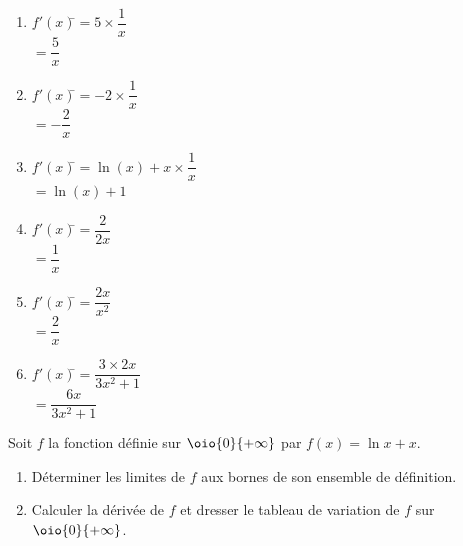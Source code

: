 \documentclass[a4paper,11pt,exos]{nsi} %
\begin{document}
\textcolor{UGLiBlue}{
    \begin{multicols}{3}
        \begin{enumerate}
            \item \begin{tabbing}
                $f'(x)$\=$=5\times \dfrac{1}{x}$\\[.5em]
                \>$=\dfrac{5}{x}$
            \end{tabbing}
            \item \begin{tabbing}
                $f'(x)$\=$=-2\times \dfrac{1}{x}$\\[.5em]
                \>$=-\dfrac{2}{x}$
            \end{tabbing}
            \item \begin{tabbing}
                $f'(x)$\=$=\ln\left(x\right)+x\times \dfrac{1}{x}$\\[.5em]
                \>$=\ln(x)+1$
            \end{tabbing}
            \item \begin{tabbing}
                $f'(x)$\=$=\dfrac{2}{2x}$\\[.5em]
                \>$=\dfrac{1}{x}$
            \end{tabbing}
            \item \begin{tabbing}
                $f'(x)$\=$=\dfrac{2x}{x^2}$\\[.5em]
                \>$=\dfrac{2}{x}$
            \end{tabbing}
            \item \begin{tabbing}
                $f'(x)$\=$=\dfrac{3\times 2x}{3x^2+1}$\\[.5em]
                \>$=\dfrac{6x}{3x^2+1}$
            \end{tabbing}
        \end{enumerate}
    \end{multicols}
}

\exo{}
Soit $f$ la fonction définie sur $\oio{0}{+\infty}$ par $f(x)=\ln x +x$.
\begin{enumerate}
    \item Déterminer les limites de $f$ aux bornes de son ensemble de définition.
    \item Calculer la dérivée de $f$ et dresser le tableau de variation de $f$ sur $\oio{0}{+\infty}$.
\end{enumerate}
\end{document}
